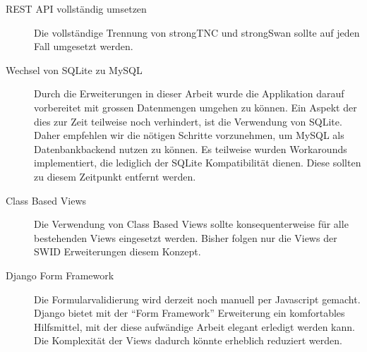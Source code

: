 \begin{description} 

	\item[REST API vollständig umsetzen] Die vollständige Trennung von strongTNC
	und strongSwan sollte auf jeden Fall umgesetzt werden.
	
	\item[Wechsel von SQLite zu MySQL] Durch die Erweiterungen in dieser Arbeit
	wurde die Applikation darauf vorbereitet mit grossen Datenmengen umgehen zu
	können. Ein Aspekt der dies zur Zeit teilweise noch verhindert, ist die
	Verwendung von SQLite. Daher empfehlen wir die nötigen Schritte vorzunehmen, um
	MySQL als Datenbankbackend nutzen zu können. Es teilweise wurden Workarounds
	implementiert, die lediglich der SQLite Kompatibilität dienen. Diese sollten zu
	diesem Zeitpunkt entfernt werden.
	
	\item[Class Based Views] Die Verwendung von Class Based Views sollte
	konsequenterweise für alle bestehenden Views eingesetzt werden. Bisher folgen
	nur die Views der SWID Erweiterungen diesem Konzept.
	
	\item[Django Form Framework] Die Formularvalidierung wird derzeit noch manuell
	per Javascript gemacht. Django bietet mit der \enquote{Form Framework}
	Erweiterung ein komfortables Hilfsmittel, mit der diese aufwändige Arbeit
	elegant erledigt werden kann. Die Komplexität der Views dadurch könnte
	erheblich reduziert werden.
	
\end{description}